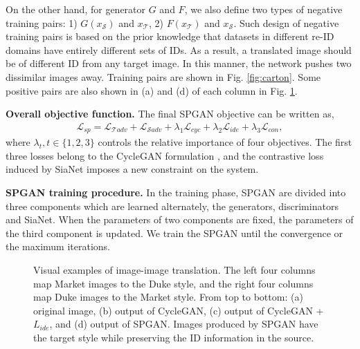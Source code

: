 \documentclass[10pt,twocolumn,letterpaper]{article}
\begin{document}
On the other hand, for generator $G$ and $F$, we also define two types of  negative training pairs: 1) $G(x_\mathcal{S})$ and $x_\mathcal{T}$, 2) $F(x_\mathcal{T})$ and $x_\mathcal{S}$. Such design of negative training pairs is based on the prior knowledge that datasets in different re-ID domains have entirely different sets of IDs. As a result, a translated image should be of  different ID from any target image. In this manner, the network pushes two dissimilar images away. Training pairs are shown in Fig. \ref{fig:carton}. Some positive pairs are also shown in (a) and (d) of each column in Fig. \ref{fig3}.


\textbf{Overall objective function.}
The final SPGAN objective can be written as,
\begin{equation}
\begin{split}
\mathcal{L}_{sp}= \mathcal{L}_{\mathcal{T}adv} + \mathcal{L}_{\mathcal{S}adv} + \lambda_{1} \mathcal{L}_{cyc} + \lambda_{2}\mathcal{L}_{ide} + \lambda_{3} \mathcal{L}_{con},
\end{split}
\label{Full Objective}
\end{equation}
\label{eq:Objective}where $\lambda_{t}, t\in \{1,2,3 \}$ controls the relative importance of four objectives. The first three losses belong to the CycleGAN formulation \cite{cycle}, and the contrastive loss induced by SiaNet imposes a new constraint on the system. 


\textbf{SPGAN training procedure.} In the training phase, SPGAN are divided into three components which are learned alternately, the generators, discriminators and SiaNet. When the parameters of two components are fixed, the parameters of the third component is updated. We train the SPGAN until the convergence or the maximum iterations. 

\captionsetup[subfigure]{labelformat=empty}
\begin{figure}[tbp]
\setlength{\abovecaptionskip}{-0.2cm} 
\setlength{\belowcaptionskip}{-0.2cm}
	\centering
	
	\caption{Visual examples of image-image translation. The left four columns map Market images to the Duke style, and the right four columns map Duke images to the Market style. From top to bottom: (a) original image, (b) output of CycleGAN, (c) output of CycleGAN + $L_{ide}$, and (d) output of SPGAN. Images produced by SPGAN have the target style while preserving the ID information in the source.}
\label{fig3}
\end{figure}
\end{document}
